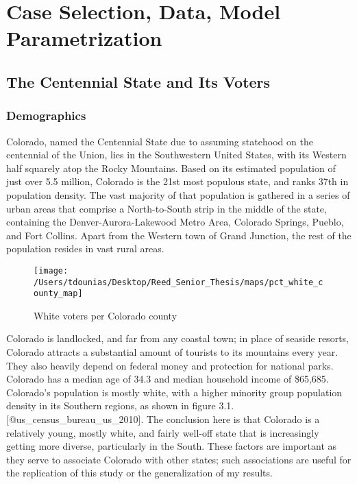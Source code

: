 \documentclass[]{article}
\title{}
\author{}
\date{}
\begin{document}
\section{Case Selection, Data, Model
Parametrization}\label{case-selection-data-model-parametrization}

\subsection{The Centennial State and Its
Voters}\label{the-centennial-state-and-its-voters}

\subsubsection{Demographics}\label{demographics}

Colorado, named the Centennial State due to assuming statehood on the
centennial of the Union, lies in the Southwestern United States, with
its Western half squarely atop the Rocky Mountains. Based on its
estimated population of just over 5.5 million, Colorado is the 21st most
populous state, and ranks 37th in population density. The vast majority
of that population is gathered in a series of urban areas that comprise
a North-to-South strip in the middle of the state, containing the
Denver-Aurora-Lakewood Metro Area, Colorado Springs, Pueblo, and Fort
Collins. Apart from the Western town of Grand Junction, the rest of the
population resides in vast rural areas.

\begin{figure}

{\centering \texttt{[image: /Users/tdounias/Desktop/Reed\_Senior\_Thesis/maps/pct\_white\_county\_map]} 

}

\caption{White voters per Colorado county}\label{fig:white pct map}
\end{figure}

Colorado is landlocked, and far from any coastal town; in place of
seaside resorts, Colorado attracts a substantial amount of tourists to
its mountains every year. They also heavily depend on federal money and
protection for national parks. Colorado has a median age of 34.3 and
median household income of \$65,685. Colorado's population is mostly
white, with a higher minority group population density in its Southern
regions, as shown in figure 3.1. {[}@us\_census\_bureau\_us\_2010{]}.
The conclusion here is that Colorado is a relatively young, mostly
white, and fairly well-off state that is increasingly getting more
diverse, particularly in the South. These factors are important as they
serve to associate Colorado with other states; such associations are
useful for the replication of this study or the generalization of my
results.
\end{document}
